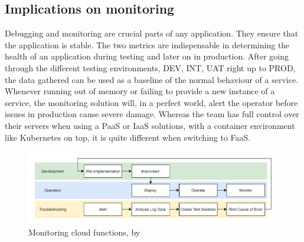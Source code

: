 \documentclass[a4paper,twoside,11pt, pagesize]{scrartcl}
\begin{document}
\begin{spacing}{1.2}
\subsection{Implications on monitoring}
Debugging and monitoring are crucial parts of any application. They ensure that the application is stable. The two metrics are indispensable in determining the health of an application during testing and later on in production. After going through the different testing environments, DEV, INT, UAT right up to PROD, the data gathered can be used as a baseline of the normal behaviour of a service. Whenever running out of memory or failing to provide a new instance of a service, the monitoring solution will, in a perfect world, alert the operator before issues in production cause severe damage. Whereas the team has full control over their servers when using a PaaS or IaaS solutions, with a container environment like Kubernetes on top, it is quite different when switching to FaaS.
\begin{figure}[H]
\label{fig:manner}
\centering
\includegraphics[width=1\textwidth]{monitoring}
\caption{Monitoring cloud functions, by \cite{manner2019troubleshooting}}
\end{figure}

\end{spacing}
\end{document}
